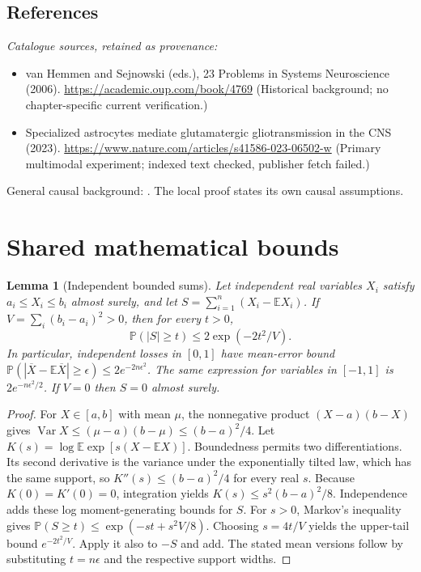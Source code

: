 \documentclass[11pt]{article}
\newcommand{\E}{\mathbb E}
\newcommand{\Prob}{\mathbb P}
\DeclareMathOperator{\Var}{Var}
\providecommand{\E}{\mathbb E}
\providecommand{\Prob}{\mathbb P}
\providecommand{\Var}{\operatorname{Var}}
\newtheorem{sharedlemma}{Lemma}[section]
\begin{document}
\subsection{References}
\noindent\emph{Catalogue sources, retained as provenance:}
\begin{itemize}
\item van Hemmen and Sejnowski (eds.), 23 Problems in Systems Neuroscience (2006). \url{https://academic.oup.com/book/4769} (Historical background; no chapter-specific current verification.)
\item Specialized astrocytes mediate glutamatergic gliotransmission in the CNS (2023). \url{https://www.nature.com/articles/s41586-023-06502-w} (Primary multimodal experiment; indexed text checked, publisher fetch failed.)
\end{itemize}
\noindent General causal background: \cite{pearl}. The local proof states its own causal assumptions.
\clearpage


\appendix
\section{Shared mathematical bounds}\label{app:bounds}
\begin{sharedlemma}[Independent bounded sums]\label{lem:bounded}
Let independent real variables $X_i$ satisfy $a_i\leq X_i\leq b_i$ almost surely,
and let $S=\sum_{i=1}^n(X_i-\E X_i)$. If
$V=\sum_i(b_i-a_i)^2>0$, then for every $t>0$,
\[
 \Prob(|S|\geq t)\leq 2\exp(-2t^2/V).
\]
In particular, independent losses in $[0,1]$ have mean-error bound
$\Prob(|\overline X-\E\overline X|\geq\epsilon)
\leq2e^{-2n\epsilon^2}$. The same expression for variables in $[-1,1]$
is $2e^{-n\epsilon^2/2}$. If $V=0$ then $S=0$ almost surely.
\end{sharedlemma}
\begin{proof}
For $X\in[a,b]$ with mean $\mu$, the nonnegative product
$(X-a)(b-X)$ gives
$\Var X\leq(\mu-a)(b-\mu)\leq(b-a)^2/4$.
Let $K(s)=\log\E\exp[s(X-\E X)]$.
Boundedness permits two differentiations. Its second derivative is the variance
under the exponentially tilted law, which has the same support, so
$K''(s)\leq(b-a)^2/4$ for every real $s$.
Because $K(0)=K'(0)=0$, integration yields
$K(s)\leq s^2(b-a)^2/8$.
Independence adds these log moment-generating bounds for $S$.
For $s>0$, Markov's inequality gives
$\Prob(S\geq t)\leq\exp(-st+s^2V/8)$.
Choosing $s=4t/V$ yields the upper-tail bound $e^{-2t^2/V}$.
Apply it also to $-S$ and add. The stated mean versions follow by substituting
$t=n\epsilon$ and the respective support widths.
\end{proof}
\end{document}
